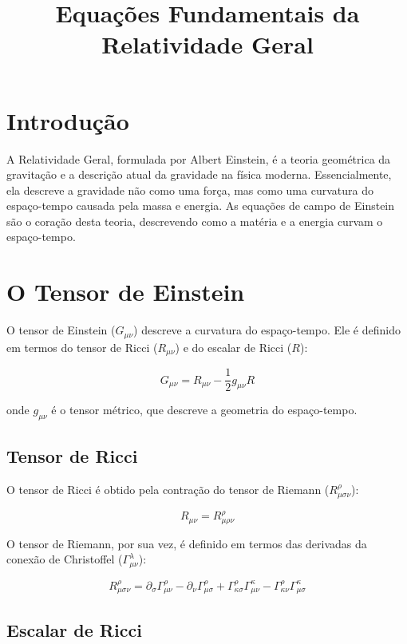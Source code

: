 \documentclass[a4paper,12pt]{article}
\title{Equações Fundamentais da Relatividade Geral}
\author{}
\date{}
\begin{document}
\maketitle
\thispagestyle{empty}

\section*{Introdução}

A Relatividade Geral, formulada por Albert Einstein, é a teoria geométrica da gravitação e a descrição atual da gravidade na física moderna. Essencialmente, ela descreve a gravidade não como uma força, mas como uma curvatura do espaço-tempo causada pela massa e energia. As equações de campo de Einstein são o coração desta teoria, descrevendo como a matéria e a energia curvam o espaço-tempo.

\section{O Tensor de Einstein}

O tensor de Einstein ($G_{\mu\nu}$) descreve a curvatura do espaço-tempo. Ele é definido em termos do tensor de Ricci ($R_{\mu\nu}$) e do escalar de Ricci ($R$):

$$G_{\mu\nu} = R_{\mu\nu} - \frac{1}{2}g_{\mu\nu}R$$

onde $g_{\mu\nu}$ é o tensor métrico, que descreve a geometria do espaço-tempo.

\subsection{Tensor de Ricci}

O tensor de Ricci é obtido pela contração do tensor de Riemann ($R^\rho_{\mu\sigma\nu}$):

$$R_{\mu\nu} = R^\rho_{\mu\rho\nu}$$

O tensor de Riemann, por sua vez, é definido em termos das derivadas da conexão de Christoffel ($\Gamma^\lambda_{\mu\nu}$):

$$R^\rho_{\mu\sigma\nu} = \partial_\sigma \Gamma^\rho_{\mu\nu} - \partial_\nu \Gamma^\rho_{\mu\sigma} + \Gamma^\rho_{\kappa\sigma} \Gamma^\kappa_{\mu\nu} - \Gamma^\rho_{\kappa\nu} \Gamma^\kappa_{\mu\sigma}$$

\subsection{Escalar de Ricci}
\end{document}

